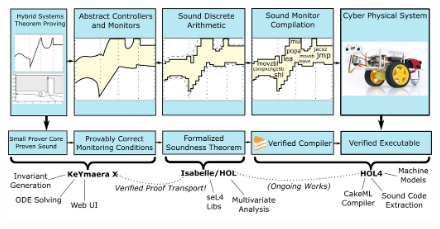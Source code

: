 \documentclass[12pt]{cmuthesis}
\theoremstyle{definition}
\theoremstyle{remark}
\newcommand{\sandbox}{\textsf{\upshape sandbox}\xspace}
\begin{document}
\begin{figure}[tb]
\centering
\includegraphics[width=6in]{graphics/veriphy-overview.png}
%
%

\end{figure}
\end{document}
